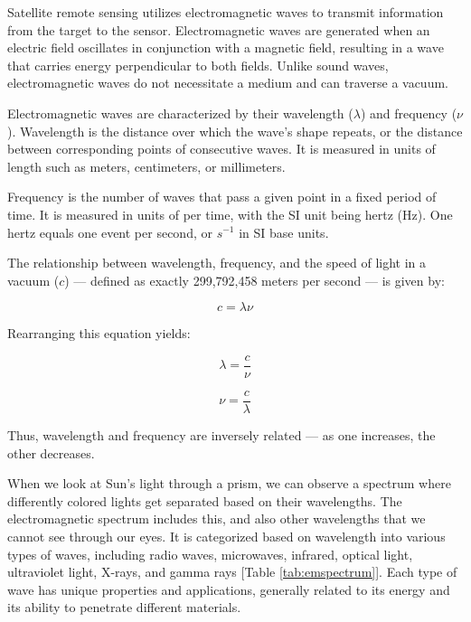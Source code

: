 \documentclass[
  12 pt,
]{Nemilov}
\begin{document}
Satellite remote sensing utilizes electromagnetic waves to transmit information from the target to the sensor. Electromagnetic waves are generated when an electric field oscillates in conjunction with a magnetic field, resulting in a wave that carries energy perpendicular to both fields. Unlike sound waves, electromagnetic waves do not necessitate a medium and can traverse a vacuum.

Electromagnetic waves are characterized by their wavelength (\(\lambda\)) and frequency (\(\nu\)). Wavelength is the distance over which the wave's shape repeats, or the distance between corresponding points of consecutive waves. It is measured in units of length such as meters, centimeters, or millimeters.

Frequency is the number of waves that pass a given point in a fixed period of time. It is measured in units of per time, with the SI unit being hertz (Hz). One hertz equals one event per second, or \(s^{-1}\) in SI base units.

The relationship between wavelength, frequency, and the speed of light in a vacuum (\(c\)) --- defined as exactly 299,792,458 meters per second --- is given by:

\[c = \lambda \nu\]

Rearranging this equation yields:

\[\lambda = \frac{c}{\nu}\]

\[\nu = \frac{c}{\lambda}\]

Thus, wavelength and frequency are inversely related --- as one increases, the other decreases.

When we look at Sun's light through a prism, we can observe a spectrum where differently colored lights get separated based on their wavelengths. The electromagnetic spectrum includes this, and also other wavelengths that we cannot see through our eyes. It is categorized based on wavelength into various types of waves, including radio waves, microwaves, infrared, optical light, ultraviolet light, X-rays, and gamma rays {[}Table \ref{tab:emspectrum}{]}\citep{NASAem}. Each type of wave has unique properties and applications, generally related to its energy and its ability to penetrate different materials.
\end{document}
